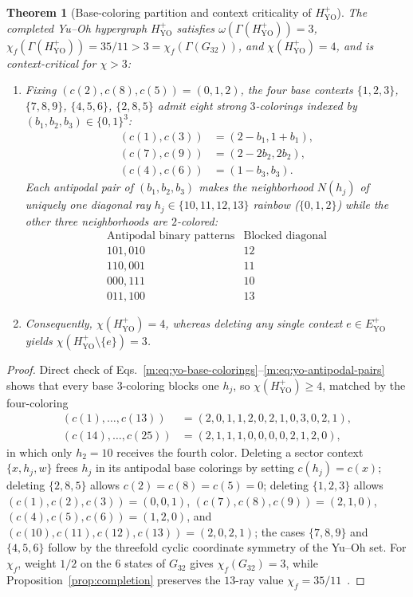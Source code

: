\documentclass[aps,pra,reprint,superscriptaddress,longbibliography,nofootinbib,floatfix,10pt]{revtex4-2}
\newtheorem{theorem}{Theorem}
\theoremstyle{definition}\newtheorem{definition}[theorem]{Definition}
\theoremstyle{remark}\newtheorem{remark}[theorem]{Remark}
\newcommand{\YO}{\mathrm{YO}}\newcommand{\ip}[2]{\langle #1,#2\rangle}
\begin{document}
\begin{theorem}[Base-coloring partition and context criticality of $H_{\YO}^{+}$]\label{m:thm:yo-criticality}\label{m:prop:fractional}
The completed Yu--Oh hypergraph $H_{\YO}^{+}$ satisfies $\omega(\Gamma(H_{\YO}^{+}))=3$, $\chi_f(\Gamma(H_{\YO}^{+}))=35/11>3=\chi_f(\Gamma(G_{32}))$, and $\chi(H_{\YO}^{+})=4$, and is context-critical for $\chi>3$:
\begin{enumerate}
\item Fixing $(c(2),c(8),c(5))=(0,1,2)$, the four base contexts $\{1,2,3\}$, $\{7,8,9\}$, $\{4,5,6\}$, $\{2,8,5\}$ admit eight strong $3$-colorings indexed by $(b_1,b_2,b_3)\in\{0,1\}^3$:
\begin{equation}\label{m:eq:yo-base-colorings}
\begin{aligned}
(c(1),c(3))&=(2-b_1,1+b_1),\\
(c(7),c(9))&=(2-2b_2,2b_2),\\
(c(4),c(6))&=(1-b_3,b_3).
\end{aligned}
\end{equation}
Each antipodal pair of $(b_1,b_2,b_3)$ makes the neighborhood $N(h_j)$ of \emph{uniquely one} diagonal ray $h_j\in\{10,11,12,13\}$ rainbow ($\{0,1,2\}$) while the other three neighborhoods are $2$-colored:
\begin{equation}\label{m:eq:yo-antipodal-pairs}
\begin{array}{c|c}
\text{Antipodal binary patterns}&\text{Blocked diagonal}\\\hline
101,010&12\\110,001&11\\000,111&10\\011,100&13
\end{array}
\end{equation}
\item Consequently, $\chi(H_{\YO}^{+})=4$, whereas deleting any single context $e\in E_{\YO}^{+}$ yields $\chi(H_{\YO}^{+}\setminus\{e\})=3$.
\end{enumerate}
\end{theorem}
\begin{proof}
Direct check of Eqs.~\eqref{m:eq:yo-base-colorings}--\eqref{m:eq:yo-antipodal-pairs} shows that every base $3$-coloring blocks one $h_j$, so $\chi(H_{\YO}^{+})\ge4$, matched by the four-coloring
\begin{align*}
(c(1),\ldots,c(13))&=(2,0,1,1,2,0,2,1,0,3,0,2,1),\\
(c(14),\ldots,c(25))&=(2,1,1,1,0,0,0,0,2,1,2,0),
\end{align*}
in which only $h_2=10$ receives the fourth color. Deleting a sector context $\{x,h_j,w\}$ frees $h_j$ in its antipodal base colorings by setting $c(h_j)=c(x)$; deleting $\{2,8,5\}$ allows $c(2)=c(8)=c(5)=0$; deleting $\{1,2,3\}$ allows $(c(1),c(2),c(3))=(0,0,1)$, $(c(7),c(8),c(9))=(2,1,0)$, $(c(4),c(5),c(6))=(1,2,0)$, and $(c(10),c(11),c(12),c(13))=(2,0,2,1)$; the cases $\{7,8,9\}$ and $\{4,5,6\}$ follow by the threefold cyclic coordinate symmetry of the Yu--Oh set. For $\chi_f$, weight $1/2$ on the $6$ states of $G_{32}$ gives $\chi_f(G_{32})=3$, while Proposition~\ref{prop:completion} preserves the $13$-ray value $\chi_f=35/11$~\cite{cabello2015sic}.
\end{proof}
\end{document}
